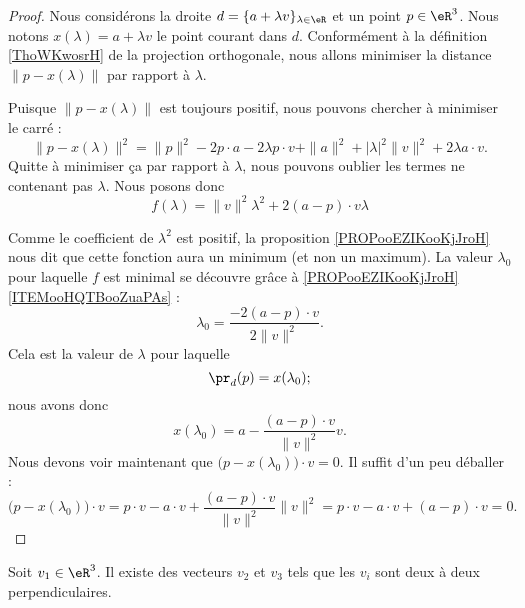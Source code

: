 \begin{proof}
	Nous considérons la droite \( d=\{ a+\lambda v \}_{\lambda\in \eR}\) et un point \( p\in \eR^3\). Nous notons \( x(\lambda)=a+\lambda v\) le point courant dans \( d\). Conformément à la définition \ref{ThoWKwosrH} de la projection orthogonale, nous allons minimiser la distance \( \| p-x(\lambda) \|\) par rapport à \( \lambda\).

	Puisque \( \| p-x(\lambda) \|\) est toujours positif, nous pouvons chercher à minimiser le carré :
	\begin{equation}
		\| p- x(\lambda) \|^2=\| p \|^2-2p\cdot a-2\lambda p\cdot v+\| a \|^2+| \lambda |^2\| v \|^2+2\lambda a\cdot v.
	\end{equation}
	Quitte à minimiser ça par rapport à \( \lambda\), nous pouvons oublier les termes ne contenant pas \( \lambda\). Nous posons donc
	\begin{equation}
		f(\lambda)=\| v \|^2\lambda^2+ 2(a-p)\cdot v\lambda
	\end{equation}

	Comme le coefficient de \( \lambda^2\) est positif, la proposition \ref{PROPooEZIKooKjJroH} nous dit que cette fonction aura un minimum (et non un maximum). La valeur \( \lambda_0\) pour laquelle \( f\) est minimal se découvre grâce à \ref{PROPooEZIKooKjJroH}\ref{ITEMooHQTBooZuaPAs} :
	\begin{equation}
		\lambda_0=\frac{ -2(a-p)\cdot v }{ 2\| v \|^2 }.
	\end{equation}
	Cela est la valeur de \( \lambda\) pour laquelle
	\begin{equation}
		\pr_d(p)=x(\lambda_0);
	\end{equation}
	nous avons donc
	\begin{equation}
		x(\lambda_0)=a-\frac{ (a-p)\cdot v }{ \| v \|^2 }v.
	\end{equation}
	Nous devons voir maintenant que \( \big( p-x(\lambda_0) \big)\cdot v=0\). Il suffit d'un peu déballer :
	\begin{equation}
		\big( p-x(\lambda_0) \big)\cdot v=p\cdot v-a\cdot v+\frac{ (a-p)\cdot v }{ \| v \|^2 }\| v \|^2=p\cdot v-a\cdot v+(a-p)\cdot v=0.
	\end{equation}
\end{proof}

\begin{lemma}       \label{LEMooGUVMooPXtXnV}
	Soit \( v_1\in \eR^3\). Il existe des vecteurs \( v_2\) et \( v_3\) tels que les \( v_i\) sont deux à deux perpendiculaires.
\end{lemma}


